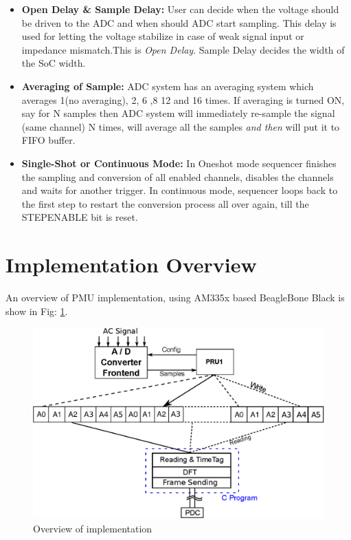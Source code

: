 \begin{itemize}
	\item \textbf{Open Delay \& Sample Delay:} User can decide when the voltage should be driven to the ADC and when should ADC start sampling. This delay is used for letting the voltage stabilize in case of weak signal input or impedance mismatch.This is \emph{Open Delay}. Sample Delay decides the width of the SoC width.
	\item \textbf{Averaging of Sample:} ADC system has an averaging system which averages 1(no averaging), 2, 6 ,8 12 and 16 times. If averaging is turned ON, say for N samples then ADC system will immediately re-sample the signal (same channel) N times, will average all the samples \emph{and then} will put it to FIFO buffer.
	\item \textbf{Single-Shot or Continuous Mode:} In Oneshot mode sequencer finishes the sampling and conversion of all enabled channels, disables the channels and waits for another trigger. In continuous mode, sequencer loops back to the first step to restart the conversion process all over again, till the STEPENABLE bit is reset.    
\end{itemize} 

\section{Implementation Overview}
An overview of PMU implementation, using AM335x based BeagleBone Black is show in Fig: \ref{fig:implementation}.

\begin{figure}[h]
	\includegraphics[width=\textwidth]{fig/sys_overview.eps}
	\caption{Overview of implementation}
	\label{fig:implementation}
\end{figure}

